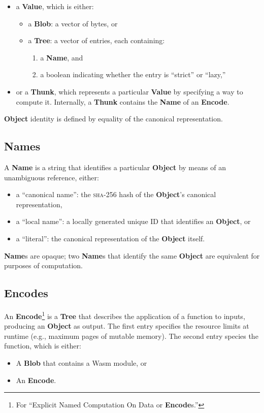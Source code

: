 \documentclass{article}
\newcommand{\blob}{\textbf{Blob}\xspace}
\newcommand{\valuex}{\textbf{Value}\xspace}
\newcommand{\object}{\textbf{Object}\xspace}
\newcommand{\encode}{\textbf{Encode}\xspace}
\newcommand{\thunk}{\textbf{Thunk}\xspace}
\newcommand{\encodes}{\textbf{Encode}s\xspace}
\newcommand{\name}{\textbf{Name}\xspace}
\newcommand{\names}{\textbf{Name}s\xspace}
\newcommand{\tree}{\textbf{Tree}\xspace}
\begin{document}
\begin{itemize}[itemsep=0pt]
\item a \valuex, which is either:
\begin{itemize}[itemsep=0pt]
  \item a \blob: a vector of bytes, or

  \item a \tree: a vector of entries, each containing:

    \begin{enumerate}[topsep=0pt, itemsep=0pt]
    \item a \name, and

    \item a boolean indicating whether the entry is ``strict'' or ``lazy,''
    \end{enumerate}
\end{itemize}

\item or a \thunk, which represents a particular \valuex by specifying
  a way to compute it. Internally, a \thunk contains the \name of an \encode.
\end{itemize}

\object identity is defined by equality of the canonical representation.

\subsection{\names}

A \name is a string that identifies a particular \object by means of an unambiguous
reference, either:
    \begin{itemize}[itemsep=0pt]
    \item a ``canonical name'': the \textsc{sha-256} hash of the \object's canonical representation,
    \item a ``local name'': a locally generated unique ID that identifies an \object, or
    \item a ``literal'': the canonical representation of the \object itself.
    \end{itemize}

\names are opaque; two \names that identify the same \object are equivalent for purposes of computation.

\subsection{\encodes}

An \encode\footnote{For ``Explicit Named Computation On Data or
\encodes.''} is a \tree that describes the application of a function
to inputs, producing an \object as output. The first entry specifies
the resource limits at runtime (e.g., maximum pages of mutable memory). The second entry
species the function, which is either:
\begin{itemize}[itemsep=0pt]
\item A \blob that contains a Wasm module, or
\item An \encode.
\end{itemize}
\end{document}
